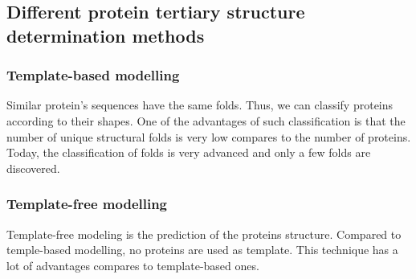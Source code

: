 \subsection{Different protein tertiary structure determination methods} 
\subsubsection{Template-based modelling}
Similar protein's sequences have the same folds. Thus, we can classify proteins according to their shapes. One of the advantages of such classification is that the number of unique structural folds is very low compares to the number of proteins.
\newline
Today, the classification of folds is very advanced and only a few folds are discovered.

\subsubsection{Template-free modelling}
Template-free modeling is the prediction of the proteins structure. Compared to temple-based modelling, no proteins are used as template. 
\newline This technique has a lot of advantages compares to template-based ones.
